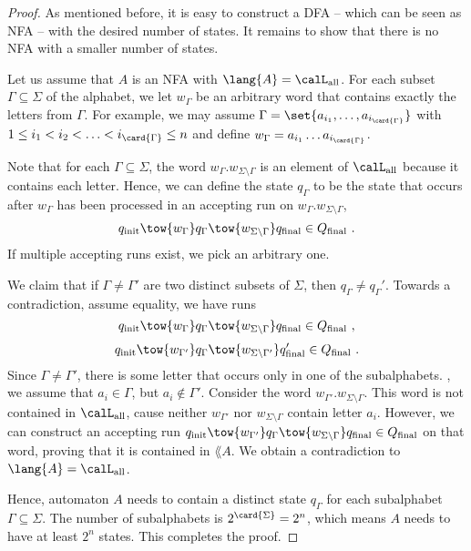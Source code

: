\documentclass[../../diss.tex]{subfiles}
\begin{document}
\begin{proof}
    As mentioned before, it is easy to construct a DFA -- which can be seen as NFA -- with the desired number of states.
    It remains to show that there is no NFA with a smaller number of states.

    Let us assume that $A$ is an NFA with $\lang{A} = \calL_{\text{all}}$.
    For each subset $\Gamma \subseteq \Sigma$ of the alphabet, we let $w_\Gamma$ be an arbitrary word that contains exactly the letters from $\Gamma$.
    For example, we may assume $\Gamma = \set{ a_{i_1}, \ldots, a_{i_{\card{\Gamma}}}}$ with $1 \leq i_1 < i_2 < \ldots < i_{\card{\Gamma}} \leq n$ and define $w_{\Gamma} = a_{i_1} \ldots a_{i_{\card{\Gamma}}}$.

    Note that for each $\Gamma \subseteq \Sigma$, the word $w_{\Gamma} . w_{\Sigma \setminus \Gamma}$ is an element of $\calL_{\text{all}}$ because it contains each letter.
    Hence, we can define the state $q_\Gamma$ to be the state that occurs after $w_{\Gamma}$ has been processed in an accepting run on $w_{\Gamma} . w_{\Sigma \setminus \Gamma}$, \ie
    \[
        q_\init \tow{ w_{\Gamma} } q_\Gamma \tow{ w_{\Sigma \setminus \Gamma} } q_\final \in Q_\final
        \ .
    \]
    If multiple accepting runs exist, we pick an arbitrary one.

    We claim that if $\Gamma \neq \Gamma'$ are two distinct subsets of $\Sigma$, then $q_\Gamma \neq q_\Gamma'$.
    Towards a contradiction, assume equality, \ie we have runs
    \[
        q_\init \tow{ w_{\Gamma} } q_\Gamma \tow{ w_{\Sigma \setminus \Gamma} } q_\final \in Q_\final
        \ ,
    \]
    \[
        q_\init \tow{ w_{\Gamma'} } q_\Gamma \tow{ w_{\Sigma \setminus \Gamma'} } q_\final' \in Q_\final
        \ .
    \]
    Since $\Gamma \neq \Gamma'$, there is some letter that occurs only in one of the subalphabets.
    \Wolog, we assume that $a_i \in \Gamma$, but $a_i \not \in \Gamma'$.
    Consider the word $w_{\Gamma'}.w_{\Sigma \setminus \Gamma}$.
    This word is not contained in $\calL_{\text{all}}$, cause neither $w_{\Gamma'}$ nor $w_{\Sigma \setminus \Gamma}$ contain letter $a_i$.
    However, we can construct an accepting run $q_\init \tow{ w_{\Gamma'} } q_\Gamma \tow{ w_{\Sigma \setminus \Gamma} } q_\final \in Q_\final$ on that word, proving that it is contained in $\lang{A}$.
    We obtain a contradiction to $\lang{A} = \calL_{\text{all}}$.

    Hence, automaton $A$ needs to contain a distinct state $q_\Gamma$ for each subalphabet $\Gamma \subseteq \Sigma$.
    The number of subalphabets is $2^{\card{\Sigma}} = 2^n$, which means $A$ needs to have at least $2^n$ states.
    This completes the proof.
\end{proof}
\end{document}

